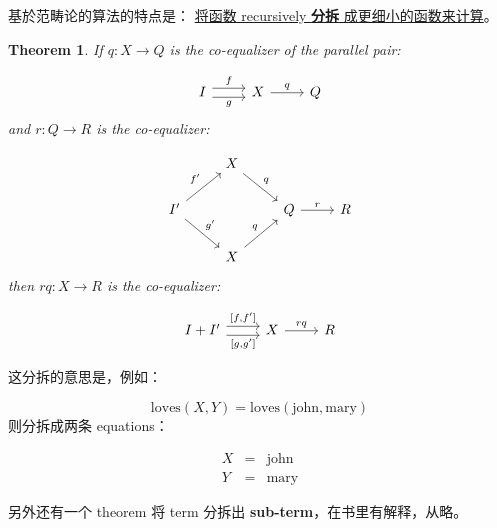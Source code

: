 \documentclass[12pt, orivec]{article}
\newtheorem{theorem}{Theorem}
\newcommand{\cc}[2]{#1}
\newcommand{\cc}[2]{#2}
\begin{document}
\cc{基於范畴论的算法的特点是： \uline{将函数 recursively }\textbf{\uline{分拆}}\uline{ 成更细小的函数来计算}。 
}{
The characteristics of the category-based algorithm are: \uline{put the function recursively }\textbf{\uline{split}}\uline{ into a more subtle function to calculate}.
}

\begin{theorem}
\cc{If $q: X \rightarrow Q$ is the co-equalizer of the parallel pair:
}{
If $q: X \rightarrow Q$ is the co-equalizer of the parallel pair:
}
\begin{equation}
\begin{tikzcd}
I \ar[r,shift left=.75ex,"f"]
  \ar[r,shift right=.75ex,swap,"g"]
& X \ar[r, "q"] & Q
\end{tikzcd}
\end{equation}
\cc{and $r: Q \rightarrow R$ is the co-equalizer:
}{
and $r: Q \rightarrow R$ is the co-equalizer:
}
\begin{equation}
\begin{tikzcd}
& X \ar[dr, "q"] & \\
I' \ar[ur, "f'"]
   \ar[dr, "g'"]
& & Q \ar[r, "r"] & R\\
& X \ar[ur,"q"] &
\end{tikzcd}
\end{equation}
\cc{then $rq:  X \rightarrow R$ is the co-equalizer:
}{
then $rq: X \rightarrow R$ is the co-equalizer:
}
\begin{equation}
\begin{tikzcd}
I + I' \arrow[shift left=.75ex]{r}{[f, f']}
       \arrow[shift right=.75ex,swap]{r}{[g, g']}
& X \ar[r, "rq"] & R
\end{tikzcd}
\end{equation}
\end{theorem}

\cc{这分拆的意思是，例如： 
}{
The meaning of this spin-off is, for example:
}
\begin{equation}
\mbox{loves}(X, Y) = \mbox{loves}(\mbox{john}, \mbox{mary})
\end{equation}
\cc{则分拆成两条 equations：
}{
Then split into two equations:
}
\begin{eqnarray}
X &=& \mbox{john} \nonumber \\
Y &=& \mbox{mary}
\end{eqnarray}

\cc{另外还有一个 theorem 将 term 分拆出 \textbf{sub-term}，在书里有解释，从略。 
}{
There is also a theorem to split the term out of \textbf{sub-term}, which is explained in the book.
}
\end{document}
